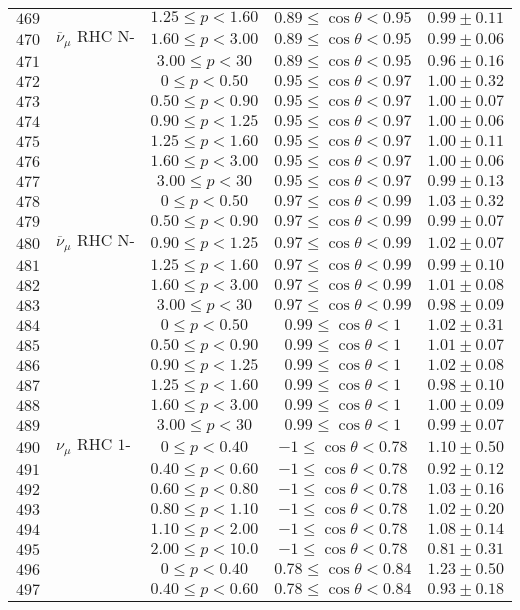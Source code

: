 \begin{longtable}[c]{ccccc}
$469$ &  & $1.25\leq p<1.60$ & $0.89\leq\cos\theta<0.95$ & $0.99\pm0.11$\tabularnewline
$470$ & $\overline{\nu}_{\mu}\text{ RHC N-Trks Air}$ & $1.60\leq p<3.00$ & $0.89\leq\cos\theta<0.95$ & $0.99\pm0.06$\tabularnewline
$471$ &  & $3.00\leq p<30$ & $0.89\leq\cos\theta<0.95$ & $0.96\pm0.16$\tabularnewline
$472$ &  & $0\leq p<0.50$ & $0.95\leq\cos\theta<0.97$ & $1.00\pm0.32$\tabularnewline
$473$ &  & $0.50\leq p<0.90$ & $0.95\leq\cos\theta<0.97$ & $1.00\pm0.07$\tabularnewline
$474$ &  & $0.90\leq p<1.25$ & $0.95\leq\cos\theta<0.97$ & $1.00\pm0.06$\tabularnewline
$475$ &  & $1.25\leq p<1.60$ & $0.95\leq\cos\theta<0.97$ & $1.00\pm0.11$\tabularnewline
$476$ &  & $1.60\leq p<3.00$ & $0.95\leq\cos\theta<0.97$ & $1.00\pm0.06$\tabularnewline
$477$ &  & $3.00\leq p<30$ & $0.95\leq\cos\theta<0.97$ & $0.99\pm0.13$\tabularnewline
$478$ &  & $0\leq p<0.50$ & $0.97\leq\cos\theta<0.99$ & $1.03\pm0.32$\tabularnewline
$479$ &  & $0.50\leq p<0.90$ & $0.97\leq\cos\theta<0.99$ & $0.99\pm0.07$\tabularnewline
$480$ & $\overline{\nu}_{\mu}\text{ RHC N-Trks Air}$ & $0.90\leq p<1.25$ & $0.97\leq\cos\theta<0.99$ & $1.02\pm0.07$\tabularnewline
$481$ &  & $1.25\leq p<1.60$ & $0.97\leq\cos\theta<0.99$ & $0.99\pm0.10$\tabularnewline
$482$ &  & $1.60\leq p<3.00$ & $0.97\leq\cos\theta<0.99$ & $1.01\pm0.08$\tabularnewline
$483$ &  & $3.00\leq p<30$ & $0.97\leq\cos\theta<0.99$ & $0.98\pm0.09$\tabularnewline
$484$ &  & $0\leq p<0.50$ & $0.99\leq\cos\theta<1$ & $1.02\pm0.31$\tabularnewline
$485$ &  & $0.50\leq p<0.90$ & $0.99\leq\cos\theta<1$ & $1.01\pm0.07$\tabularnewline
$486$ &  & $0.90\leq p<1.25$ & $0.99\leq\cos\theta<1$ & $1.02\pm0.08$\tabularnewline
$487$ &  & $1.25\leq p<1.60$ & $0.99\leq\cos\theta<1$ & $0.98\pm0.10$\tabularnewline
$488$ &  & $1.60\leq p<3.00$ & $0.99\leq\cos\theta<1$ & $1.00\pm0.09$\tabularnewline
$489$ &  & $3.00\leq p<30$ & $0.99\leq\cos\theta<1$ & $0.99\pm0.07$\tabularnewline
$490$ & $\nu_{\mu}\text{ RHC 1-Trk Air}$ & $0\leq p<0.40$ & $-1\leq\cos\theta<0.78$ & $1.10\pm0.50$\tabularnewline
$491$ &  & $0.40\leq p<0.60$ & $-1\leq\cos\theta<0.78$ & $0.92\pm0.12$\tabularnewline
$492$ &  & $0.60\leq p<0.80$ & $-1\leq\cos\theta<0.78$ & $1.03\pm0.16$\tabularnewline
$493$ &  & $0.80\leq p<1.10$ & $-1\leq\cos\theta<0.78$ & $1.02\pm0.20$\tabularnewline
$494$ &  & $1.10\leq p<2.00$ & $-1\leq\cos\theta<0.78$ & $1.08\pm0.14$\tabularnewline
$495$ &  & $2.00\leq p<10.0$ & $-1\leq\cos\theta<0.78$ & $0.81\pm0.31$\tabularnewline
$496$ &  & $0\leq p<0.40$ & $0.78\leq\cos\theta<0.84$ & $1.23\pm0.50$\tabularnewline
$497$ &  & $0.40\leq p<0.60$ & $0.78\leq\cos\theta<0.84$ & $0.93\pm0.18$\tabularnewline

\end{longtable}

